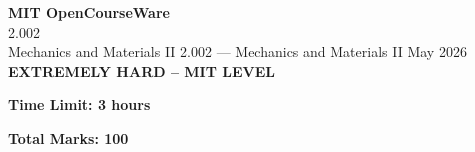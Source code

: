 \documentclass[12pt,a4paper]{exam}
\begin{document}
\begin{center}
{\LARGE \textbf{MIT OpenCourseWare}}\\2.002\\Mechanics and Materials II
\vspace{0.5cm}
{2.002} --- {Mechanics and Materials II}
\vspace{0.3cm}
May 2026
\vspace{0.3cm}
\textbf{EXTREMELY HARD -- MIT LEVEL}
\end{center}

\begin{center}
\textbf{Time Limit: 3 hours}
\end{center}

\begin{center}
\textbf{Total Marks: 100}
\end{center}

\vspace{0.5cm}
\end{document}
